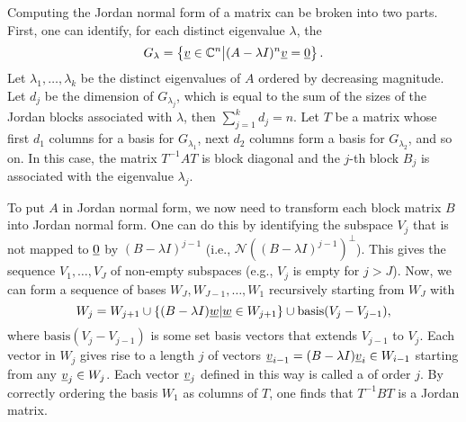 Computing the Jordan normal form of a matrix can be broken into two parts.
First, one can identify, for each distinct eigenvalue $\lambda$, the 
\[ G_\lambda = \left\{ \underline{v} \in \mathbb{C}^n \big| (A-\lambda I)^n \underline{v} = \underline{0} \right\}. \]
Let $\lambda_1 , \ldots , \lambda_k$ be the distinct eigenvalues of $A$ ordered by decreasing magnitude.
Let $d_j$ be the dimension of $G_{\lambda_j}$, which is equal to the sum of the sizes of the Jordan blocks associated with $\lambda$, then $\sum_{j=1}^k d_j = n$.
Let $T$ be a matrix whose first $d_1$ columns for a basis for $G_{\lambda_1}$, next $d_2$ columns form a basis for $G_{\lambda_2}$, and so on.
In this case, the matrix $T^{-1} A T$ is block diagonal and the $j$-th block $B_j$ is associated with the eigenvalue $\lambda_j$.

To put $A$ in Jordan normal form, we now need to transform each block matrix $B$ into Jordan normal form.
One can do this by identifying the subspace $V_j$ that is not mapped to $\underline{0}$ by $(B-\lambda I)^{j-1}$ (i.e., $\mathcal{N}\left((B- \lambda I)^{j-1} \right)^\bot$).
This gives the sequence $V_1,\ldots,V_J$ of non-empty subspaces (e.g., $V_j$ is empty for $j>J$).
Now, we can form a sequence of bases $W_J, W_{J-1},\ldots, W_1$ recursively starting from $W_J$ with
\[ W_{j} = W_{j+1} \cup \{ (B - \lambda I) \underline{w} | \underline{w} \in W_{j+1} \} \cup \textrm{basis}(V_{j} - V_{j-1}), \]
where $\textrm{basis}(V_{j} - V_{j-1})$ is some set basis vectors that extends $V_{j-1}$ to $V_j$.
Each vector in $W_j$ gives rise to a length $j$  of vectors $\underline{v}_{i-1} = (B- \lambda I) \underline{v}_i \in W_{i-1}$ starting from any $\underline{v}_j \in W_j$.
Each vector $\underline{v}_j$ defined in this way is called a  of order $j$.
By correctly ordering the basis $W_1$ as columns of $T$, one finds that $T^{-1} B T$ is a Jordan matrix.

